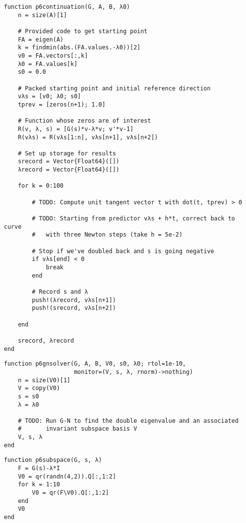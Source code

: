 \documentclass[12pt, leqno]{article} %
\begin{document}
\begin{verbatim}
function p6continuation(G, A, B, λ0)
    n = size(A)[1]
    
    # Provided code to get starting point
    FA = eigen(A)
    k = findmin(abs.(FA.values.-λ0))[2]
    v0 = FA.vectors[:,k]
    λ0 = FA.values[k]
    s0 = 0.0

    # Packed starting point and initial reference direction
    vλs = [v0; λ0; s0]
    tprev = [zeros(n+1); 1.0]

    # Function whose zeros are of interest
    R(v, λ, s) = [G(s)*v-λ*v; v'*v-1]
    R(vλs) = R(vλs[1:n], vλs[n+1], vλs[n+2])

    # Set up storage for results
    srecord = Vector{Float64}([])
    λrecord = Vector{Float64}([])
    
    for k = 0:100

        # TODO: Compute unit tangent vector t with dot(t, tprev) > 0

        # TODO: Starting from predictor vλs + h*t, correct back to curve
        #   with three Newton steps (take h = 5e-2)

        # Stop if we've doubled back and s is going negative
        if vλs[end] < 0
            break
        end
        
        # Record s and λ
        push!(λrecord, vλs[n+1])
        push!(srecord, vλs[n+2])

    end

    srecord, λrecord
end
\end{verbatim}

\begin{verbatim}
function p6gnsolver(G, A, B, V0, s0, λ0; rtol=1e-10,
                    monitor=(V, s, λ, rnorm)->nothing)
    n = size(V0)[1]
    V = copy(V0)
    s = s0
    λ = λ0

    # TODO: Run G-N to find the double eigenvalue and an associated
    #       invariant subspace basis V
    V, s, λ
end
\end{verbatim}

\begin{verbatim}
function p6subspace(G, s, λ)
    F = G(s)-λ*I
    V0 = qr(randn(4,2)).Q[:,1:2]
    for k = 1:10
        V0 = qr(F\V0).Q[:,1:2]
    end
    V0
end
\end{verbatim}
\end{document}

